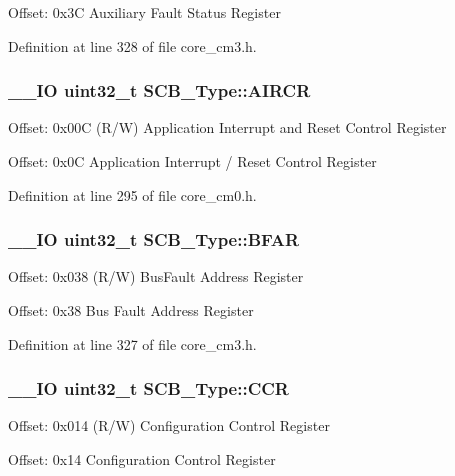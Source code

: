 Offset\-: 0x3\-C Auxiliary Fault Status Register 

Definition at line 328 of file core\-\_\-cm3.\-h.

\hypertarget{struct_s_c_b___type_a6ed3c9064013343ea9fd0a73a734f29d}{
\subsubsection[{A\-I\-R\-C\-R}]{\setlength{\rightskip}{0pt plus 5cm}\-\_\-\-\_\-\-I\-O {\bf uint32\-\_\-t} S\-C\-B\-\_\-\-Type\-::\-A\-I\-R\-C\-R}}\label{struct_s_c_b___type_a6ed3c9064013343ea9fd0a73a734f29d}
Offset\-: 0x00\-C (R/\-W) Application Interrupt and Reset Control Register

Offset\-: 0x0\-C Application Interrupt / Reset Control Register 

Definition at line 295 of file core\-\_\-cm0.\-h.

\hypertarget{struct_s_c_b___type_a31f79afe86c949c9862e7d5fce077c3a}{
\subsubsection[{B\-F\-A\-R}]{\setlength{\rightskip}{0pt plus 5cm}\-\_\-\-\_\-\-I\-O {\bf uint32\-\_\-t} S\-C\-B\-\_\-\-Type\-::\-B\-F\-A\-R}}\label{struct_s_c_b___type_a31f79afe86c949c9862e7d5fce077c3a}
Offset\-: 0x038 (R/\-W) Bus\-Fault Address Register

Offset\-: 0x38 Bus Fault Address Register 

Definition at line 327 of file core\-\_\-cm3.\-h.

\hypertarget{struct_s_c_b___type_a6d273c6b90bad15c91dfbbad0f6e92d8}{
\subsubsection[{C\-C\-R}]{\setlength{\rightskip}{0pt plus 5cm}\-\_\-\-\_\-\-I\-O {\bf uint32\-\_\-t} S\-C\-B\-\_\-\-Type\-::\-C\-C\-R}}\label{struct_s_c_b___type_a6d273c6b90bad15c91dfbbad0f6e92d8}
Offset\-: 0x014 (R/\-W) Configuration Control Register

Offset\-: 0x14 Configuration Control Register 

